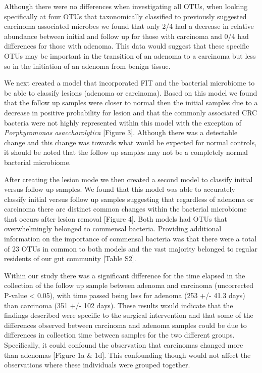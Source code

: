 \documentclass[12pt,]{article}
\begin{document}
Although there were no differences when investigating all OTUs, when
looking specifically at four OTUs that taxonomically classified to
previously suggested carcinoma associated microbes we found that only
2/4 had a decrease in relative abundance between initial and follow up
for those with carcinoma and 0/4 had differences for those with adenoma.
This data would suggest that these specific OTUs may be important in the
transition of an adenoma to a carcinoma but less so in the initiation of
an adenoma from benign tissue.

We next created a model that incorporated FIT and the bacterial
microbiome to be able to classify lesions (adenoma or carcinoma). Based
on this model we found that the follow up samples were closer to normal
then the initial samples due to a decrease in positive probability for
lesion and that the commonly associated CRC bacteria were not highly
represented within this model with the exception of \emph{Porphyromonas
asaccharolytica} {[}Figure 3{]}. Although there was a detectable change
and this change was towards what would be expected for normal controls,
it should be noted that the follow up samples may not be a completely
normal bacterial microbiome.

After creating the lesion mode we then created a second model to
classify initial versus follow up samples. We found that this model was
able to accurately classify initial versus follow up samples suggesting
that regardless of adenoma or carcinoma there are distinct common
changes within the bacterial microbiome that occurs after lesion removal
{[}Figure 4{]}. Both models had OTUs that overwhelmingly belonged to
commensal bacteria. Providing additional information on the importance
of commensal bacteria was that there were a total of 23 OTUs in common
to both models and the vast majority belonged to regular residents of
our gut community {[}Table S2{]}.

Within our study there was a significant difference for the time elapsed
in the collection of the follow up sample between adenoma and carcinoma
(uncorrected P-value \textless{} 0.05), with time passed being less for
adenoma (253 +/- 41.3 days) than carcinoma (351 +/- 102 days). These
results would indicate that the findings described were specific to the
surgical intervention and that some of the differences observed between
carcinoma and adenoma samples could be due to differences in collection
time between samples for the two different groups. Specifically, it
could confound the observation that carcinomas changed more than
adenomas {[}Figure 1a \& 1d{]}. This confounding though would not affect
the observations where these individuals were grouped together.
\end{document}
